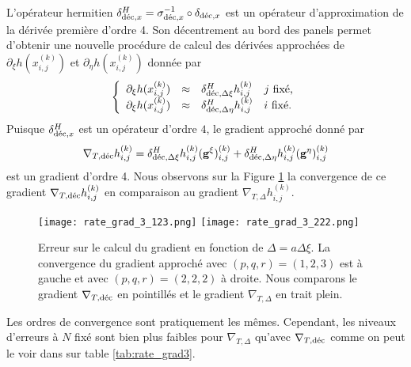 L'opérateur hermitien $\delta^H_{\dec,x} = \sigma_{\dec,x}^{-1} \circ \delta_{\dec,x}$ est un opérateur d'approximation de la dérivée première d'ordre 4. Son décentrement au bord des panels permet d'obtenir une nouvelle procédure de calcul des dérivées approchées de $\partial_{\xi} h(x_{i,j}^{(k)})$ et $\partial_{\eta} h(x_{i,j}^{(k)})$ donnée par 
\begin{equation}
\left\lbrace
\begin{array}{rcll}
\partial_{\xi} h(x_{i,j}^{(k)}) & \approx & \delta^H_{\dec,\Delta \xi} h_{i,j}^{(k)} & j \text{ fixé,}\\
\partial_{\xi} h(x_{i,j}^{(k)}) & \approx & \delta^H_{\dec,\Delta \eta} h_{i,j}^{(k)} & i \text{ fixé.}
\end{array}
\right.
\end{equation}
Puisque $\delta^H_{\dec,x}$ est un opérateur d'ordre $4$, le gradient approché donné par 
\begin{equation}
\nabla_{T,\dec} h_{i,j}^{(k)} = \delta^H_{\dec,\Delta \xi} h_{i,j}^{(k)} ( \mathbf{g}^{\xi} )_{i,j}^{(k)} + \delta^H_{\dec,\Delta \eta} h_{i,j}^{(k)} ( \mathbf{g}^{\eta} )_{i,j}^{(k)}
\end{equation}
est un gradient d'ordre 4.
Nous observons sur la Figure \ref{fig:rate_grad3} la convergence de ce gradient $\nabla_{T,\dec} h_{i,j}^{(k)}$ en comparaison au gradient $\nabla_{T,\Delta} h_{i,j}^{(k)}$.
\begin{figure}[htbp]
\begin{center}
\texttt{[image: rate\_grad\_3\_123.png]}
\texttt{[image: rate\_grad\_3\_222.png]}
\end{center}
\caption{Erreur sur le calcul du gradient en fonction de $\Delta = a \Delta \xi$. La convergence du gradient approché avec $(p,q,r)=(1,2,3)$ est à gauche et avec $(p,q,r)=(2,2,2)$ à droite. Nous comparons le gradient $\nabla_{T,\dec}$ en pointillés et le gradient $\nabla_{T,\Delta}$ en trait plein.}
\label{fig:rate_grad3}
\end{figure}
Les ordres de convergence sont pratiquement les mêmes. Cependant, les niveaux d'erreurs à $N$ fixé sont bien plus faibles pour $\nabla_{T,\Delta}$ qu'avec $\nabla_{T,\dec}$ comme on peut le voir dans sur table \ref{tab:rate_grad3}.

